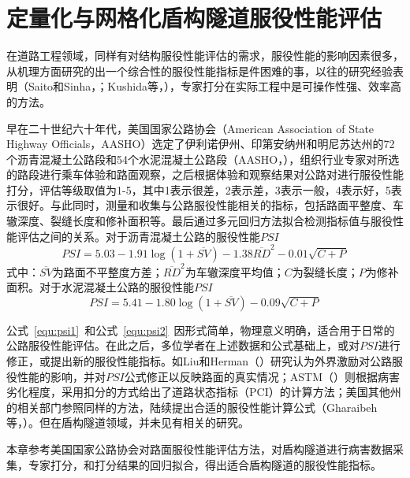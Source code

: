 \chapter{定量化与网格化盾构隧道服役性能评估}
\label{chap:tsi}

在道路工程领域，同样有对结构服役性能评估的需求，服役性能的影响因素很多，从机理方面研究的出一个综合性的服役性能指标是件困难的事，以往的研究经验表明（Saito和Sinha，\citeyear{saito1991delphi}；Kushida等，\citeyear{kushida1997development}），专家打分在实际工程中是可操作性强、效率高的方法。

早在二十世纪六十年代，美国国家公路协会（American Association of State Highway Officials，AASHO）选定了伊利诺伊州、印第安纳州和明尼苏达州的72个沥青混凝土公路段和54个水泥混凝土公路段（AASHO，\citeyear{AASHO1962the}），组织行业专家对所选的路段进行乘车体验和路面观察，之后根据体验和观察结果对公路对进行服役性能打分，评估等级取值为1-5，其中1表示很差，2表示差，3表示一般，4表示好，5表示很好。与此同时，测量和收集与公路服役性能相关的指标，包括路面平整度、车辙深度、裂缝长度和修补面积等。最后通过多元回归方法拟合检测指标值与服役性能评估之间的关系。对于沥青混凝土公路的服役性能$PSI$
\begin{equation}
	\label{equ:psi1}
	PSI=5.03-1.91\log (1+\overline{SV})-1.38{{\overline{RD}}^{2}}-0.01\sqrt{C+P}
\end{equation}
式中：$\overline{SV}$为路面不平整度方差；${{\overline{RD}}^{2}}$为车辙深度平均值；$C$为裂缝长度；$P$为修补面积。对于水泥混凝土公路的服役性能$PSI$
\begin{equation}
	\label{equ:psi2}
	PSI=5.41-1.80\log (1+\overline{SV})-0.09\sqrt{C+P}
\end{equation}

公式~\ref{equ:psi1}~和公式~\ref{equ:psi2}~因形式简单，物理意义明确，适合用于日常的公路服役性能评估。在此之后，多位学者在上述数据和公式基础上，或对$PSI$进行修正，或提出新的服役性能指标。如Liu和Herman（\citeyear{liu1996new}）研究认为外界激励对公路服役性能的影响，并对$PSI$公式修正以反映路面的真实情况；ASTM（\citeyear{astm20096433}）则根据病害劣化程度，采用扣分的方式给出了道路状态指标（PCI）的计算方法；美国其他州的相关部门参照同样的方法，陆续提出合适的服役性能计算公式（Gharaibeh等，\citeyear{gharaibeh2009assessing}）。但在盾构隧道领域，并未见有相关的研究。

本章参考美国国家公路协会对路面服役性能评估方法，对盾构隧道进行病害数据采集，专家打分，和打分结果的回归拟合，得出适合盾构隧道的服役性能指标。

